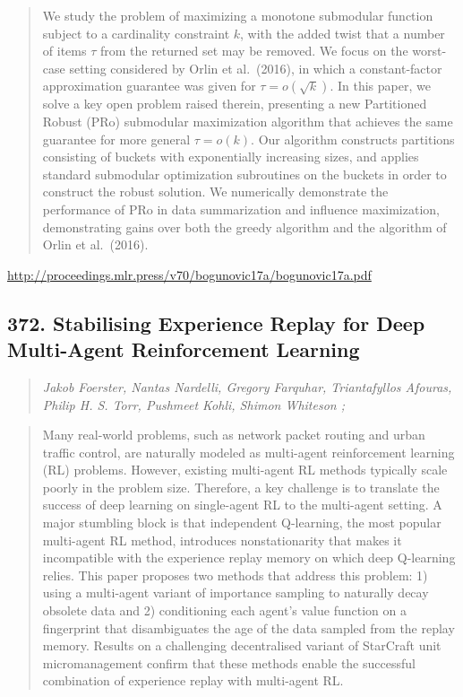 \documentclass{article}
\begin{document}
\begin{quote}
    We study the problem of maximizing a monotone submodular function subject to a cardinality constraint $k$, with the added twist that a number of items $\tau$ from the returned set may be removed. We focus on the worst-case setting considered by Orlin et al.\ (2016), in which a constant-factor approximation guarantee was given for $\tau = o(\sqrt{k})$. In this paper, we solve a key open problem raised therein, presenting a new Partitioned Robust (PRo) submodular maximization algorithm that achieves the same guarantee for more general $\tau = o(k)$. Our algorithm constructs partitions consisting of buckets with exponentially increasing sizes, and applies standard submodular optimization subroutines on the buckets in order to construct the robust solution. We numerically demonstrate the performance of PRo in data summarization and influence maximization, demonstrating gains over both the greedy algorithm and the algorithm of Orlin et al.\ (2016).  \end{quote}

\href{http://proceedings.mlr.press/v70/bogunovic17a/bogunovic17a.pdf}{http://proceedings.mlr.press/v70/bogunovic17a/bogunovic17a.pdf}

\subsection{372. Stabilising Experience Replay for Deep Multi-Agent Reinforcement Learning}

\begin{quote}
\footnotesize{\textit{Jakob Foerster, Nantas Nardelli, Gregory Farquhar, Triantafyllos Afouras, Philip H. S. Torr, Pushmeet Kohli, Shimon Whiteson ;}}
\end{quote}

\begin{quote}
    Many real-world problems, such as network packet routing and urban traffic control, are naturally modeled as multi-agent reinforcement learning (RL) problems. However, existing multi-agent RL methods typically scale poorly in the problem size. Therefore, a key challenge is to translate the success of deep learning on single-agent RL to the multi-agent setting. A major stumbling block is that independent Q-learning, the most popular multi-agent RL method, introduces nonstationarity that makes it incompatible with the experience replay memory on which deep Q-learning relies. This paper proposes two methods that address this problem: 1) using a multi-agent variant of importance sampling to naturally decay obsolete data and 2) conditioning each agent’s value function on a fingerprint that disambiguates the age of the data sampled from the replay memory. Results on a challenging decentralised variant of StarCraft unit micromanagement confirm that these methods enable the successful combination of experience replay with multi-agent RL.  \end{quote}
\end{document}
